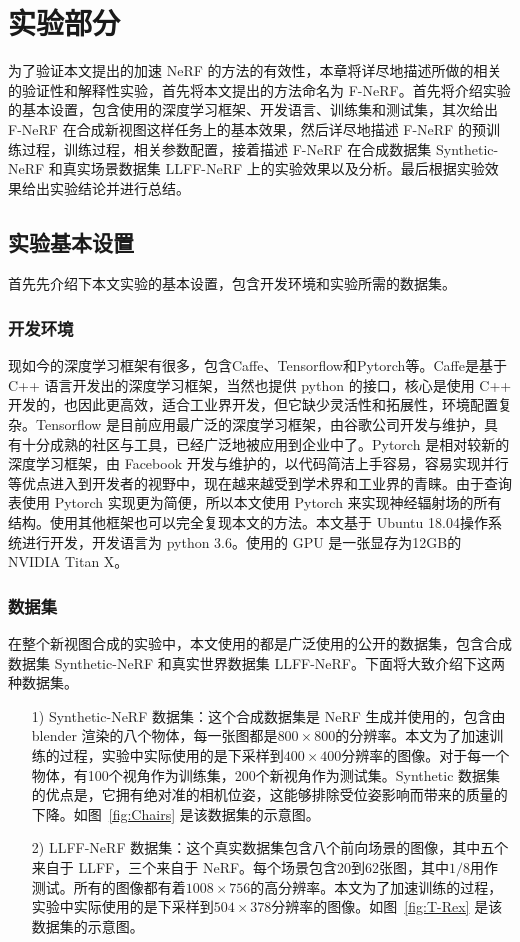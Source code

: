 
\chapter{实验部分}\label{equations}
为了验证本文提出的加速 NeRF 的方法的有效性，本章将详尽地描述所做的相关的验证性和解释性实验，首先将本文提出的方法命名为 F-NeRF。首先将介绍实验的基本设置，包含使用的深度学习框架、开发语言、训练集和测试集，其次给出 F-NeRF 在合成新视图这样任务上的基本效果，然后详尽地描述 F-NeRF 的预训练过程，训练过程，相关参数配置，接着描述 F-NeRF 在合成数据集 Synthetic-NeRF 和真实场景数据集 LLFF-NeRF 上的实验效果以及分析。最后根据实验效果给出实验结论并进行总结。
\section{实验基本设置}\label{experiment-set}
首先先介绍下本文实验的基本设置，包含开发环境和实验所需的数据集。
\subsection{开发环境}
现如今的深度学习框架有很多，包含Caffe、Tensorflow和Pytorch等。Caffe是基于 C++ 语言开发出的深度学习框架，当然也提供 python 的接口，核心是使用 C++ 开发的，也因此更高效，适合工业界开发，但它缺少灵活性和拓展性，环境配置复杂。Tensorflow 是目前应用最广泛的深度学习框架，由谷歌公司开发与维护，具有十分成熟的社区与工具，已经广泛地被应用到企业中了。Pytorch 是相对较新的深度学习框架，由 Facebook 开发与维护的，以代码简洁上手容易，容易实现并行等优点进入到开发者的视野中，现在越来越受到学术界和工业界的青睐。由于查询表使用 Pytorch 实现更为简便，所以本文使用 Pytorch 来实现神经辐射场的所有结构。使用其他框架也可以完全复现本文的方法。本文基于 Ubuntu 18.04操作系统进行开发，开发语言为 python 3.6。使用的 GPU 是一张显存为12GB的 NVIDIA Titan X。 
\subsection{数据集} \label{Dataset}
在整个新视图合成的实验中，本文使用的都是广泛使用的公开的数据集，包含合成数据集 Synthetic-NeRF 和真实世界数据集 LLFF-NeRF。下面将大致介绍下这两种数据集。
\begin{enumerate}
    \item[1)] Synthetic-NeRF 数据集：这个合成数据集是 NeRF 生成并使用的，包含由 blender 渲染的八个物体，每一张图都是$800 \times 800$的分辨率。本文为了加速训练的过程，实验中实际使用的是下采样到$400 \times 400$分辨率的图像。对于每一个物体，有100个视角作为训练集，200个新视角作为测试集。Synthetic 数据集的优点是，它拥有绝对准的相机位姿，这能够排除受位姿影响而带来的质量的下降。如图~\ref{fig:Chairs} 是该数据集的示意图。
    \item[2)] LLFF-NeRF 数据集：这个真实数据集包含八个前向场景的图像，其中五个来自于 LLFF\cite{mildenhall2019local}，三个来自于 NeRF。每个场景包含20到62张图，其中$1/8$用作测试。所有的图像都有着$1008 \times 756$的高分辨率。本文为了加速训练的过程，实验中实际使用的是下采样到$504 \times 378$分辨率的图像。如图~\ref{fig:T-Rex} 是该数据集的示意图。
\end{enumerate}

